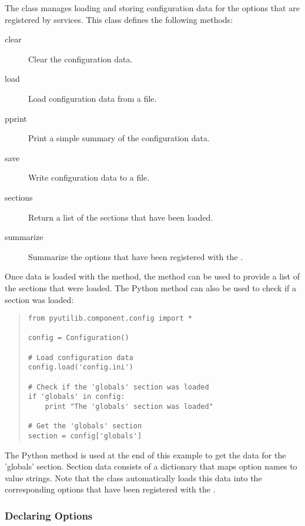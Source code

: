 The  class manages loading and storing configuration data for the options
that are registered by \pcasp services.  This class defines the following methods:
\begin{description}

\item[clear] Clear the configuration data.
\item[load] Load configuration data from a file.
\item[pprint] Print a simple summary of the configuration data.
\item[save] Write configuration data to a file.
\item[sections] Return a list of the sections that have been loaded.
\item[summarize] Summarize the options that have been registered with the \pca.

\end{description}
Once data is loaded with the  method, the  method can be used to provide a list of the sections that were loaded.  The Python  method can 
also be used to check if a section was loaded:
\begin{quotation}
\begin{lstlisting}
from pyutilib.component.config import *

config = Configuration()

# Load configuration data
config.load('config.ini')

# Check if the 'globals' section was loaded
if 'globals' in config:
    print "The 'globals' section was loaded"

# Get the 'globals' section
section = config['globals']
\end{lstlisting}
\end{quotation}
The Python  method is used at the end of this example to get the data for the 'globals' section.  Section data consists of a dictionary that maps option names to value strings.  Note that the  class automatically loads this data into the 
corresponding options that have been registered with the \pca.


\subsubsection{Declaring Options}

